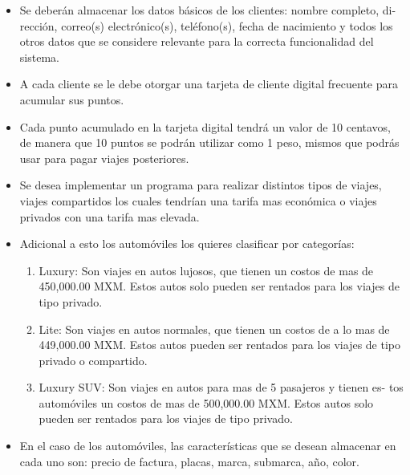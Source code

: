 \documentclass{article}
\begin{document}
               {\begin{itemize}
                 \item Se deberán almacenar los datos básicos de los clientes: nombre completo, di-
                   rección, correo(s) electrónico(s), teléfono(s), fecha de nacimiento y todos los
                   otros datos que se considere relevante para la correcta funcionalidad del sistema.
                   
                 \item A cada cliente se le debe otorgar una tarjeta de cliente digital frecuente para
                   acumular sus puntos.
                   
                 \item Cada punto acumulado en la tarjeta digital tendrá un valor de 10 centavos, de
                   manera que 10 puntos se podrán utilizar como 1 peso, mismos que podrás usar
                   para pagar viajes posteriores.
                   
                 \item Se desea implementar un programa para realizar distintos tipos de viajes, viajes
                   compartidos los cuales tendrían una tarifa mas económica o viajes privados
                   con una tarifa mas elevada.
                   
                 \item Adicional a esto los automóviles los quieres clasificar por categorías:
                   \begin{enumerate}
                   \item Luxury: Son viajes en autos lujosos, que tienen un costos de mas de 450,000.00
                     MXM. Estos autos solo pueden ser rentados para los viajes de tipo privado.
                   \item Lite: Son viajes en autos normales, que tienen un costos de a lo mas de
                     449,000.00 MXM. Estos autos pueden ser rentados para los viajes de tipo
                     privado o compartido.
                   \item Luxury SUV: Son viajes en autos para mas de 5 pasajeros y tienen es-
                     tos automóviles un costos de mas de 500,000.00 MXM. Estos autos solo
                     pueden ser rentados para los viajes de tipo privado.
                   \end{enumerate}

                 \item En el caso de los automóviles, las características que se desean almacenar en
                   cada uno son: precio de factura, placas, marca, submarca, año, color.
                   

\end{itemize}}
\end{document}
